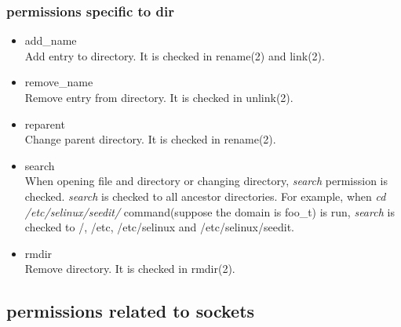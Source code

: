 \documentclass{article}
\begin{document}
\subsubsection{permissions specific to dir}
\begin{itemize}
 \item  add\_name\\
	Add entry to directory. It is checked in rename(2) and link(2).
 \item  remove\_name\\
	Remove entry from directory. It is checked in unlink(2).
 \item  reparent\\
	Change parent directory. It is checked in rename(2).
 \item search\\
	When opening file and directory or changing directory, {\it search }
	permission is checked.  {\it search } is checked to all ancestor
       directories. For example, when {\it cd /etc/selinux/seedit/}
       command(suppose the domain is foo\_t) is run, {\it search } is
       checked to /, /etc, /etc/selinux and /etc/selinux/seedit.
 \item rmdir\\
	Remove directory. It is checked in rmdir(2).
\end{itemize}

\subsection{permissions related to sockets}
\end{document}
